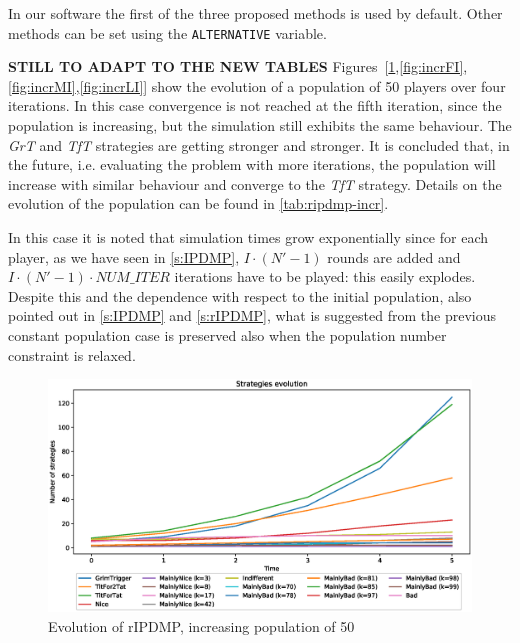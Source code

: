 \documentclass[journal,10pt,twoside]{IEEEtran}
\begin{document}
In our software the first of the three proposed methods is used by default. Other methods can be set using the \texttt{ALTERNATIVE} variable.

\textbf{STILL TO ADAPT TO THE NEW TABLES}
Figures~[\ref{fig:incrR},\ref{fig:incrFI},\ref{fig:incrMI},\ref{fig:incrLI}] show the evolution of a population of 50 players over four iterations. In this case convergence is not reached at the fifth iteration, since the population is increasing, but the simulation still exhibits the same behaviour. The \textit{GrT} and \textit{TfT} strategies are getting stronger and stronger. It is concluded that, in the future, i.e. evaluating the problem with more iterations, the population will increase with similar behaviour and converge to the \textit{TfT} strategy. Details on the evolution of the population can be found in \autoref{tab:ripdmp-incr}.

In this case it is noted that simulation times grow exponentially since for each player, as we have seen in \autoref{s:IPDMP}, $I\cdot(N'-1)$ rounds are added and $I\cdot(N'-1)\cdot{NUM\_ITER}$ iterations have to be played: this easily explodes. Despite this and the dependence with respect to the initial population, also pointed out in \autoref{s:IPDMP} and \autoref{s:rIPDMP}, what is suggested from the previous constant population case is preserved also when the population number constraint is relaxed.

\begin{figure}[!ht]
    \centering
    \includegraphics[width=1\columnwidth]{../img/ripdmp-incr/ripdmp-evolution-increasing-pop-50}
    \caption{Evolution of rIPDMP, increasing population of 50}
    \label{fig:incrR}
\end{figure}
\end{document}
